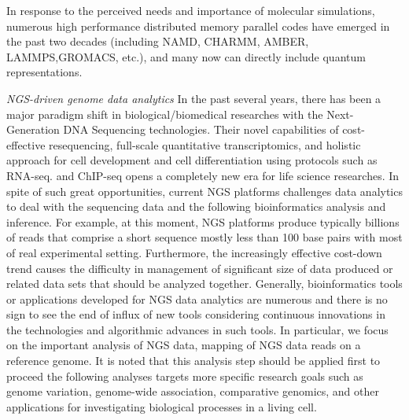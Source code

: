 \documentclass{sig-alternate}
\begin{document}

In response to the perceived needs and importance of molecular
simulations, numerous high performance distributed memory parallel codes
have emerged in the past two decades (including NAMD, CHARMM, AMBER,
LAMMPS,GROMACS, etc.), and many now can
directly include quantum representations. 

\textit{NGS-driven genome data analytics}
In the past several years, there has been a major paradigm shift in biological/biomedical researches with the Next-Generation DNA Sequencing technologies\cite{mardis2008-tig,metzker2010,mardis2008-arghg}.  Their novel capabilities of cost-effective resequencing, full-scale quantitative transcriptomics, and holistic approach for cell development and cell differentiation using protocols such as RNA-seq. and ChIP-seq opens a completely new era for life science researches\cite{sorek2010,mortazavi2008}.  In spite of such great opportunities, current NGS platforms challenges data analytics to deal with the sequencing data and the following bioinformatics analysis and inference.  For example, at this moment, NGS platforms produce typically billions of reads that comprise a short sequence mostly less than 100 base pairs with most of real experimental setting\cite{alex2009,trapnell2009}.  Furthermore, the increasingly effective cost-down trend causes the difficulty in management of significant size of data produced or related data sets that should be analyzed together.  
Generally, bioinformatics tools or applications developed for NGS data analytics are numerous and there is no sign to see the end of influx of new tools considering continuous innovations in the technologies and algorithmic advances in such tools.  In particular, we focus on the  important analysis of NGS data, mapping of NGS data reads on a reference genome.  It is noted that this analysis step should be applied first to proceed the following analyses targets more specific research goals such as genome variation, genome-wide association, comparative genomics, and other applications for investigating biological processes in a living cell.     
\end{document}
